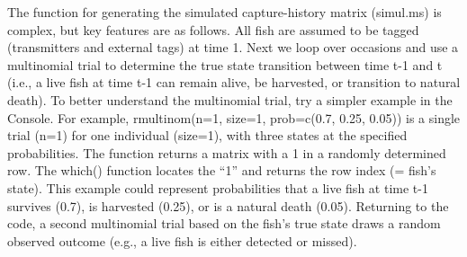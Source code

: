 \documentclass[
]{krantz}
\begin{document}
The function for generating the simulated capture-history matrix (simul.ms) is complex, but key features are as follows. All fish are assumed to be tagged (transmitters and external tags) at time 1. Next we loop over occasions and use a multinomial trial to determine the true state transition between time t-1 and t (i.e., a live fish at time t-1 can remain alive, be harvested, or transition to natural death). To better understand the multinomial trial, try a simpler example in the Console. For example, rmultinom(n=1, size=1, prob=c(0.7, 0.25, 0.05)) is a single trial (n=1) for one individual (size=1), with three states at the specified probabilities. The function returns a matrix with a 1 in a randomly determined row. The which() function locates the ``1'' and returns the row index (= fish's state). This example could represent probabilities that a live fish at time t-1 survives (0.7), is harvested (0.25), or is a natural death (0.05). Returning to the code, a second multinomial trial based on the fish's true state draws a random observed outcome (e.g., a live fish is either detected or missed).
\end{document}

